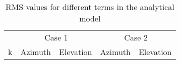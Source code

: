 
\begin{table}[h]
    \centering
    \caption{RMS values for different terms in the analytical model}
    \begin{tabular}{c|cccc}
    \multicolumn{1}{c}{} & \multicolumn{2}{c}{Case 1} & \multicolumn{2}{c}{Case 2} \\
    k & Azimuth & Elevation & Azimuth & Elevation \\
    \hline
    \end{tabular}
\end{table}